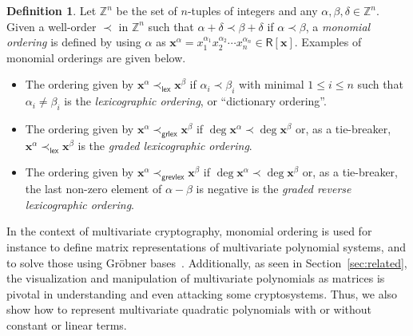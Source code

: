 \documentclass[12pt, a4paper, oneside]{memoir}
\theoremstyle{definition}
\newtheorem{definition}[theorem]{Definition}
\begin{document}
\begin{definition}
  Let $\mathbb{Z}^{n}$ be the set of $n$-tuples of integers and any $\alpha, \beta, \delta \in \mathbb{Z}^{n}$. Given a well-order $\prec$ in $\mathbb{Z}^{n}$ such that $\alpha + \delta \prec \beta + \delta$ if $\alpha \prec \beta$, a \emph{monomial ordering} is defined by using $\alpha$ as $\mathbf{x}^{\alpha} = x_{1}^{\alpha_{1}} x_{2}^{\alpha_{2}} \cdots x_{n}^{\alpha_{n}} \in \mathsf{R}[\mathbf{x}]$. Examples of monomial orderings are given below.
  
  \begin{itemize}
    \item The ordering given by $\mathbf{x}^{\alpha} \prec_{\mathsf{lex}} \mathbf{x}^{\beta}$ if $\alpha_{i} \prec \beta_{i}$ with minimal $1 \leq i \leq n$ such that $\alpha_{i} \neq \beta_{i}$ is the \emph{lexicographic ordering}, or ``dictionary ordering''.
    \item The ordering given by $\mathbf{x}^{\alpha} \prec_{\mathsf{grlex}} \mathbf{x}^{\beta}$ if $\deg \mathbf{x}^{\alpha} \prec \deg \mathbf{x}^{\beta}$ or, as a tie-breaker, $\mathbf{x}^{\alpha} \prec_{\mathsf{lex}} \mathbf{x}^{\beta}$ is the \emph{graded lexicographic ordering}.
    \item The ordering given by $\mathbf{x}^{\alpha} \prec_{\mathsf{grevlex}} \mathbf{x}^{\beta}$ if $\deg \mathbf{x}^{\alpha} \prec \deg \mathbf{x}^{\beta}$ or, as a tie-breaker, the last non-zero element of $\alpha - \beta$ is negative is the \emph{graded reverse lexicographic ordering}.
  \end{itemize}
\end{definition}

In the context of multivariate cryptography, monomial ordering is used for instance to define matrix representations of multivariate polynomial systems, and to solve those using Gröbner bases~\cite[Sec.~21.4]{Gathen:2013}. Additionally, as seen in Section~\ref{sec:related}, the visualization and manipulation of multivariate polynomials as matrices is pivotal in understanding and even attacking some cryptosystems. Thus, we also show how to represent multivariate quadratic polynomials with or without constant or linear terms.
\end{document}

